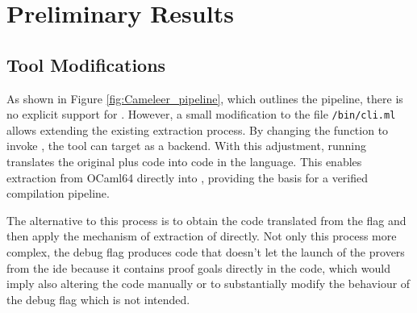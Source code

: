 
%

\chapter{Preliminary Results}
\label{cha:Preliminary_Results}



\section{Tool Modifications}

As shown in Figure \ref{fig:Cameleer_pipeline}, which outlines the \cameleer pipeline, there is no explicit support for \cml. 
However, a small modification to the file \texttt{/bin/cli.ml} allows extending the existing extraction process. By changing the 
 function to invoke , 
the tool can target \cml as a backend. With this adjustment, running  translates
the original \ocaml plus \gospel code into code in the \cml language. This enables extraction from \textsf{OCaml64} directly 
into \cml, providing the basis for a verified compilation pipeline.

The alternative to this process is to obtain the code translated \whyml from the flag  and then apply the 
mechanism of extraction of \whythree directly. Not only this process more complex, the debug flag produces code that doesn't 
let the launch of the provers from the \whythree ide because it contains proof goals directly in the code, which would imply 
also altering the code manually or to substantially modify the behaviour of the debug flag which is not intended.

